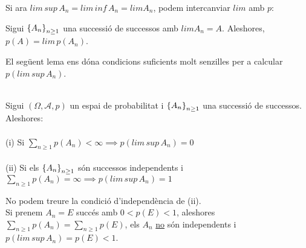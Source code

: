 Si ara $lim \, sup\, A_{n} = lim\, inf\, A_{n} = lim A_{n}$, podem intercanviar $lim$ amb $p$:

\begin{prop}
  Sigui $\left\{A_{n}\right\}_{n\geq 1}$ una successió de successos amb $lim A_{n} = A$. Aleshores, $p(A) = lim \, p(A_{n})$. \\
\end{prop}

El següent lema ens dóna condicions suficients molt senzilles per a calcular $p(lim \, sup \, A_{n})$.

\begin{lema}
  \- \\
  Sigui $(\Omega, \mathcal{A}, p)$ un espai de probabilitat i $\left\{A_{n}\right\}_{n\geq 1}$ una successió de successos. Aleshores: \\\\
  
  (i) Si $\sum\limits_{n\geq 1}p(A_{n}) < \infty \implies p(lim \, sup \, A_{n}) = 0$ \\\\
  
  (ii) Si els $\left\{A_{n}\right\}_{n\geq 1}$ són successos independents i $\sum\limits_{n\geq 1}p(A_{n}) = \infty \implies p(lim \, sup \, A_{n}) = 1$
\end{lema}

\begin{obs}
  No podem treure la condició d'independència de (ii). \\
  Si prenem $A_{n} = E$ succés amb $0 < p(E) < 1$, aleshores $\sum\limits_{n\geq 1}p(A_{n}) = \sum\limits_{n\geq 1}p(E)$, els $A_{n}$ \underline{no} són independents i  $p(lim \, sup \, A_{n}) = p(E) < 1$.
\end{obs}
